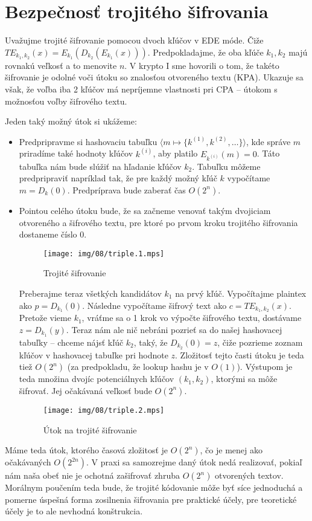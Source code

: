 \section{Bezpečnosť trojitého šifrovania}

Uvažujme trojité šifrovanie pomocou dvoch kľúčov v EDE móde.
Čiže $TE_{k_1,k_2} (x) = E_{k_1}(D_{k_2}(E_{k_1}(x)))$.
Predpokladajme, že oba kľúče $k_1, k_2$ majú rovnakú veľkosť a to
menovite $n$.
V krypto I sme hovorili o tom, že takéto šifrovanie je odolné voči
útoku so znalosťou otvoreného textu (KPA).
Ukazuje sa však, že voľba iba 2 kľúčov má nepríjemne vlastnosti pri
CPA -- útokom s možnosťou voľby šifrového textu.

Jeden taký možný útok si ukážeme:
\begin{itemize}
    \item Predpripravme si hashovaciu tabuľku
        $\langle m \mapsto \{k^{(1)}, k^{(2)}, \dots \} \rangle$,
        kde správe $m$ priradíme také hodnoty kľúčov $k^{(i)}$,
        aby platilo $E_{k^{(i)}}(m)=0$. Táto tabuľka nám bude slúžiť
        na hľadanie kľúčov $k_2$.
        Tabuľku môžeme predpripraviť napríklad tak, že pre každý možný
        kľúč $k$ vypočítame $m=D_k(0)$. Predpríprava bude zaberať čas
        $O(2^n)$.
    \item Pointou celého útoku bude, že sa začneme venovať takým
        dvojiciam otvoreného a šifrového textu, pre ktoré po prvom kroku
        trojitého šifrovania dostaneme číslo 0.
        \begin{figure}[h]
            \centering
            \texttt{[image: img/08/triple.1.mps]}
            \caption{Trojité šifrovanie}
            \label{fig:triple}
        \end{figure}
        Preberajme teraz všetkých kandidátov $k_1$ na prvý kľúč.
        Vypočítajme plaintex ako $p=D_{k_1}(0)$.
        Následne vypočítame šifrový text ako $c=TE_{k_1,k_2}(x)$.
        Pretože vieme $k_1$, vráťme sa o 1 krok vo výpočte šifrového
        textu, dostávame $z=D_{k_1}(y)$.
        Teraz nám ale nič nebráni pozrieť sa do našej hashovacej
        tabuľky -- chceme nájsť kľúč $k_2$, taký, že
        $D_{k_2}(0) = z$, čiže pozrieme zoznam kľúčov v hashovacej
        tabuľke pri hodnote $z$.
        Zložitosť tejto časti útoku je teda tiež $O(2^n)$ (za
        predpokladu, že lookup hashu je v $O(1)$).
        Výstupom je teda množina dvojíc potenciálnych kľúčov
        $(k_1,k_2)$, ktorými sa môže šifrovať.
        Jej očakávaná veľkosť bude $O(2^n)$.
        \begin{figure}[h]
            \centering
            \texttt{[image: img/08/triple.2.mps]}
            \caption{Útok na trojité šifrovanie}
            \label{fig:triple-attack}
        \end{figure}
\end{itemize}
Máme teda útok, ktorého časová zložitosť je $O(2^n)$, čo je menej ako
očakávaných $O(2^{2n})$. V praxi sa samozrejme daný útok nedá
realizovať, pokiaľ nám naša obeť nie je ochotná zašifrovať zhruba
$O(2^n)$ otvorených textov. Morálnym poučením teda bude, že trojité
kódovanie môže byť síce jednoduchá a pomerne úspešná forma zosilnenia
šifrovania pre praktické účely, pre teoretické účely je to ale
nevhodná konštrukcia.
